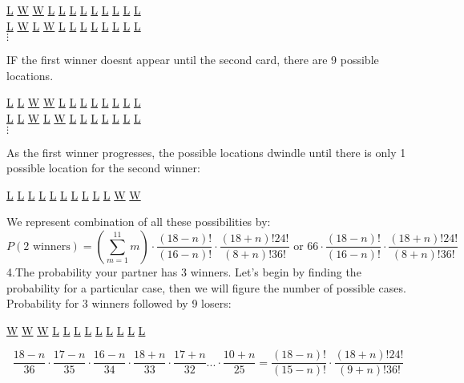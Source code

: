 \documentclass[11pt]{article}
\begin{document}
\begin {center}
  \underline{L} \underline{W} \underline{W} \underline{L} \underline{L} \underline{L} \underline{L} \underline{L} \underline{L} \underline{L} \underline{L} \underline{L}\\
\underline{L} \underline{W} \underline{L} \underline{W} \underline{L} \underline{L} \underline{L} \underline{L} \underline{L} \underline{L} \underline{L} \underline{L}\\
$\vdots$
  \end{center}
IF the first winner doesnt appear until the second card, there are 9 possible locations.
\begin {center}
  \underline{L} \underline{L} \underline{W} \underline{W} \underline{L} \underline{L} \underline{L} \underline{L} \underline{L} \underline{L} \underline{L} \underline{L}\\
\underline{L} \underline{L} \underline{W} \underline{L} \underline{W} \underline{L} \underline{L} \underline{L} \underline{L} \underline{L} \underline{L} \underline{L}\\
$\vdots$
  \end{center}
As the first winner progresses, the possible locations dwindle until there is only 1 possible location for the second winner:
\begin {center}
  \underline{L} \underline{L} \underline{L} \underline{L} \underline{L} \underline{L} \underline{L} \underline{L} \underline{L} \underline{L} \underline{W} \underline{W}\\
  \end{center}
We represent combination of all these possibilities by:
\begin{equation}
P(2\text{ winners})= \left( \displaystyle\sum_{m=1}^{11} m \right) \cdot \frac{(18-n)!}{(16-n)!}\cdot \frac{(18+n)!24!}{(8+n)!36!} \text{ or } 66 \cdot \frac{(18-n)!}{(16-n)!}\cdot \frac{(18+n)!24!}{(8+n)!36!}
\end{equation}
\indent 4.The probability your partner has 3 winners. Let's begin by finding the probability for a particular case, then we will figure the number of possible cases. Probability for 3 winners followed by 9 losers:
\begin {center}
  \underline{W} \underline{W} \underline{W} \underline{L} \underline{L} \underline{L} \underline{L} \underline{L} \underline{L} \underline{L} \underline{L} \underline{L}\\
  \end{center}
\begin {equation} 
\frac{18-n}{36}\cdot \frac{17-n}{35}\cdot \frac{16-n}{34} \cdot \frac{18+n}{33}\cdot \frac{17+n}{32}...\cdot \frac {10+n}{25}=\frac{(18-n)!}{(15-n)!}\cdot \frac{(18+n)!24!}{(9+n)!36!}
\end{equation}
\end{document}
